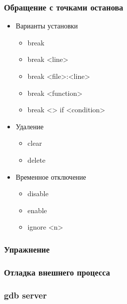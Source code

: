 \begin{frame}
 \frametitle{Обращение с точками останова}
 \begin{itemize}
   \item{Варианты установки}
    \begin{itemize}
     \item break
     \item break <line>
     \item break <file>:<line>
     \item break <function>
     \item break <> if <condition>
    \end{itemize}
    \item Удаление
     \begin{itemize}
       \item clear 
       \item delete
     \end{itemize}
     \item Временное отключение
     \begin{itemize}
       \item disable
       \item enable
       \item ignore <n>
     \end{itemize}
  \end{itemize}
\end{frame}

\begin{frame}
  \frametitle{Упражнение}
\end{frame}

\begin{frame}
 \frametitle{Отладка внешнего процесса}
\end{frame}

\begin{frame}
 \frametitle{gdb server}
\end{frame}



